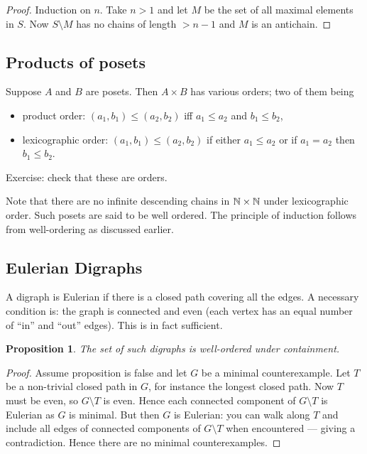 \documentclass{notes}
\theoremstyle{plain}
\newtheorem*{proposition}{Proposition}
\begin{document}
\begin{proof}
Induction on $n$.  Take $n > 1$ and let $M$ be the set of all maximal elements
in $S$.  Now $S \setminus M$ has no chains of length $> n - 1$ and $M$
is an antichain.
\end{proof}

\subsection{Products of posets}

Suppose $A$ and $B$ are posets.  Then $A \times B$ has various orders;
two of them being
\begin{itemize}
\item product order: $(a_1,b_1) \le (a_2,b_2)$ iff $a_1 \le a_2$
and $b_1 \le b_2$,
\item lexicographic order:  $(a_1,b_1) \le (a_2,b_2)$ if either
$a_1 \le a_2$ or if $a_1 = a_2$ then $b_1 \le b_2$.
\end{itemize}

Exercise: check that these are orders.

Note that there are no infinite descending chains in $\mathbb{N} \times \mathbb{N}$
under lexicographic order.  Such posets are said to be well ordered.  The
principle of induction follows from well-ordering as discussed earlier.

\subsection{Eulerian Digraphs}

A digraph is Eulerian if there is a closed path covering all the edges.
A necessary condition is: the graph is connected and even (each vertex
has an equal number of ``in'' and ``out'' edges).  This is in fact sufficient.

\begin{proposition}
The set of such digraphs is well-ordered under containment.
\end{proposition}

\begin{proof}
Assume proposition is false and let $G$ be a minimal counterexample.  Let
$T$ be a non-trivial closed path in $G$, for instance the longest closed path.
Now $T$ must be even, so $G \setminus T$ is even.  Hence each connected
component of $G \setminus T$ is Eulerian as $G$ is minimal.  But then $G$
is Eulerian: you can walk along $T$ and include all edges of connected
components of $G \setminus T$ when encountered --- giving a contradiction.
Hence there are no minimal counterexamples.
\end{proof}
\end{document}
